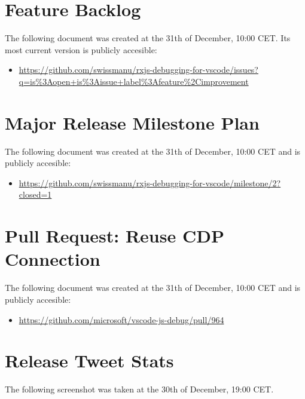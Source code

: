 \section{Feature Backlog}
\label{sec:feature-backlog}
The following document was created at the 31th of December, 10:00 CET. Its most current version is publicly accesible:

\begin{itemize}
  \item \url{https://github.com/swissmanu/rxjs-debugging-for-vscode/issues?q=is%3Aopen+is%3Aissue+label%3Afeature%2Cimprovement}
\end{itemize}






\section{Major Release Milestone Plan}
\label{sec:major-milestone}
The following document was created at the 31th of December, 10:00 CET and is publicly accesible:

\begin{itemize}
  \item \url{https://github.com/swissmanu/rxjs-debugging-for-vscode/milestone/2?closed=1}
\end{itemize}






\section{Pull Request: Reuse CDP Connection}
\label{sec:cdp-pull-request}
The following document was created at the 31th of December, 10:00 CET and is publicly accesible:

\begin{itemize}
  \item \url{https://github.com/microsoft/vscode-js-debug/pull/964}
\end{itemize}





\section{Release Tweet Stats}
\label{sec:release-tweet-stats}
The following screenshot was taken at the 30th of December, 19:00 CET.

